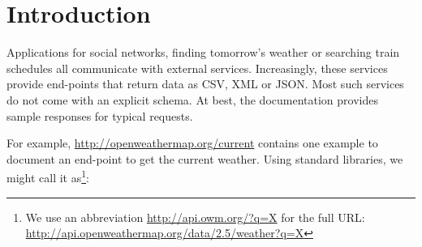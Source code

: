 \documentclass[10pt,preprint,clearpagebib]{sigplanconf}
\begin{document}
%
%

\section{Introduction}
\label{sec:introduction}

Applications for social networks, finding tomorrow's weather or searching train schedules
all communicate with external services. Increasingly, these services provide end-points that return 
data as CSV, XML or JSON. Most such services do not come with an explicit schema. At best, the 
documentation provides sample responses for typical requests.

For example, \url{http://openweathermap.org/current} contains one example to document an end-point 
to get the current weather. Using standard libraries, we might call it as\footnote{We use an abbreviation
\url{http://api.owm.org/?q=X} for the full URL:
\url{http://api.openweathermap.org/data/2.5/weather?q=X} 
}:
\end{document}
